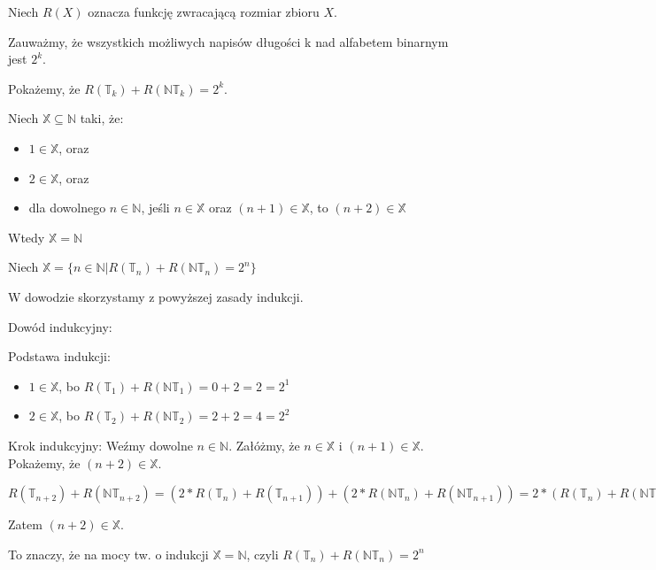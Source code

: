 Niech $R(X)$ oznacza funkcję zwracającą rozmiar zbioru $X$.
\n

\noindent
Zauważmy, że wszystkich możliwych napisów długości k nad alfabetem binarnym jest $2^k$.
\n

\noindent
Pokażemy, że $R(\mathbb{T}_k) + R(\mathbb{NT}_k) = 2^k$.
\n

\noindent
Niech $\mathbb{X} \subseteq \mathbb{N}$ taki, że:
\begin{itemize}
	\item $1 \in \mathbb{X}$, oraz
	\item $2 \in \mathbb{X}$, oraz
	\item dla dowolnego $n \in \mathbb{N}$, jeśli $n \in \mathbb{X}$ oraz $(n + 1) \in \mathbb{X}$, to $(n + 2) \in \mathbb{X}$
\end{itemize}
Wtedy $\mathbb{X} = \mathbb{N}$
\n

\noindent
Niech $\mathbb{X} = \{n \in \mathbb{N} | R(\mathbb{T}_n) + R(\mathbb{NT}_n) = 2^n\}$
\n

\noindent
W dowodzie skorzystamy z powyższej zasady indukcji.
\n

\noindent
Dowód indukcyjny:
\n

\noindent
Podstawa indukcji:
\begin{itemize}
\item $1 \in \mathbb{X}$, bo $R(\mathbb{T}_1) + R(\mathbb{NT}_1) = 0 + 2 = 2 = 2^1$
\item $2 \in \mathbb{X}$, bo $R(\mathbb{T}_2) + R(\mathbb{NT}_2) = 2 + 2 = 4 = 2^2$
\end{itemize}

\noindent
Krok indukcyjny:
\n
\noindent
Weźmy dowolne $n \in \mathbb{N}$. Załóżmy, że $n \in \mathbb{X}$ i $(n + 1) \in \mathbb{X}$. Pokażemy, że $(n + 2) \in \mathbb{X}$.
\n

\noindent
$R(\mathbb{T}_{n + 2}) + R(\mathbb{NT}_{n + 2}) = (2 * R(\mathbb{T}_{n}) + R(\mathbb{T}_{n + 1})) + (2 * R(\mathbb{NT}_{n}) + R(\mathbb{NT}_{n + 1})) = 2 * (R(\mathbb{T}_n) + R(\mathbb{NT}_n)) + (R(\mathbb{T}_{n + 1}) + R(\mathbb{NT}_{n + 1}))  \stackrel{\text{zał. ind.}}{=} 2 * 2^n + 2^{n + 1} = 2^{n + 1} + 2^{n + 1} = 2 * 2^{n + 1} = 2^{n + 2}$
\n

\noindent
Zatem $(n + 2) \in \mathbb{X}$.
\n

\noindent
To znaczy, że na mocy tw. o indukcji $\mathbb{X} = \mathbb{N}$, czyli $R(\mathbb{T}_n) + R(\mathbb{NT}_n) = 2^n$
